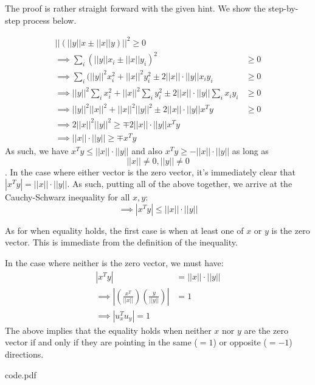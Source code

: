 \documentclass[12pt]{exam}
\begin{document}
\begin{questions}
\begin{solution}
The proof is rather straight forward with the given hint. We show the step-by-step process below.

\begin{align*}
  || (||y|| x \pm ||x|| y) ||^2 \geq 0 \tag{Square of a real number is non-negative} \\
  \implies \sum_i (||y|| x_i \pm ||x|| y_i)^2 &\geq 0 \tag{Definition of vector norm} \\
  \implies \sum_i (||y||^2 x_i^2 + ||x||^2 y_i^2 \pm 2||x||\cdot||y||x_i y_i &\geq 0 \tag{Squaring inner sum term} \\
  \implies ||y||^2 \sum_i x_i^2 + ||x||^2 \sum_i y_i^2 \pm 2||x||\cdot||y|| \sum_i x_i y_i &\geq 0 \tag{Distributing the sum} \\
  \implies ||y||^2 ||x||^2 + ||x||^2 ||y||^2 \pm 2||x||\cdot||y|| x^Ty &\geq 0 \tag{Definition of vector norm and dot product} \\
  \implies 2 ||x||^2 ||y||^2 \geq \mp 2||x|| \cdot ||y|| x^Ty \tag{Some algebra}\\
  \implies ||x|| \cdot ||y|| \geq \mp x^T y \tag{When $||x|| \neq 0$ and $||y|| \neq 0$}
\end{align*}
As such, we have $x^Ty \leq ||x|| \cdot ||y||$ and also $x^T y \geq - ||x|| \cdot ||y||$ as long as $$||x|| \neq 0, ||y|| \neq 0$$. In the case where either vector is the zero vector, it's immediately clear that $|x^T y| = ||x || \cdot ||y||$. As such, putting all of the above together, we arrive at the Cauchy-Schwarz inequality for all $x,y$:
$$
\implies |x^Ty| \leq ||x|| \cdot ||y||
$$

As for when equality holds, the first case is when at least one of $x$ or $y$ is the zero vector. This is immediate from the definition of the inequality.

In the case where neither is the zero vector, we must have:
\begin{align*}
  |x^T y| &= ||x || \cdot ||y||\\
  \implies |\left(\frac{x^T}{||x||} \right)\left(\frac{y}{||y||} \right)| &= 1 \tag{Neither $x$ nor $y$ is the zero vector} \\
  \implies |u_x^T u_y| = 1 \tag{$u_v$ is the unit vector in the direction of $v$}
\end{align*}
The above implies that the equality holds when neither $x$ nor $y$ are the zero vector if and only if they are pointing in the same ($=1$) or opposite ($= -1$) directions.

\end{solution}

\end{questions}



{code.pdf}
\end{document}
